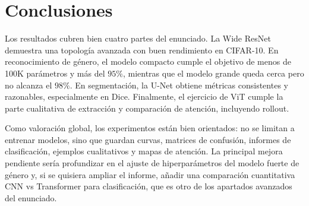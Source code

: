 \documentclass[a4paper,11pt]{article}
\begin{document}
\section{Conclusiones}

Los resultados cubren bien cuatro partes del enunciado. La Wide ResNet demuestra una topología avanzada con buen rendimiento en CIFAR-10. En reconocimiento de género, el modelo compacto cumple el objetivo de menos de 100K parámetros y más del \(95\%\), mientras que el modelo grande queda cerca pero no alcanza el \(98\%\). En segmentación, la U-Net obtiene métricas consistentes y razonables, especialmente en Dice. Finalmente, el ejercicio de ViT cumple la parte cualitativa de extracción y comparación de atención, incluyendo rollout.

Como valoración global, los experimentos están bien orientados: no se limitan a entrenar modelos, sino que guardan curvas, matrices de confusión, informes de clasificación, ejemplos cualitativos y mapas de atención. La principal mejora pendiente sería profundizar en el ajuste de hiperparámetros del modelo fuerte de género y, si se quisiera ampliar el informe, añadir una comparación cuantitativa CNN vs Transformer para clasificación, que es otro de los apartados avanzados del enunciado.
\end{document}
